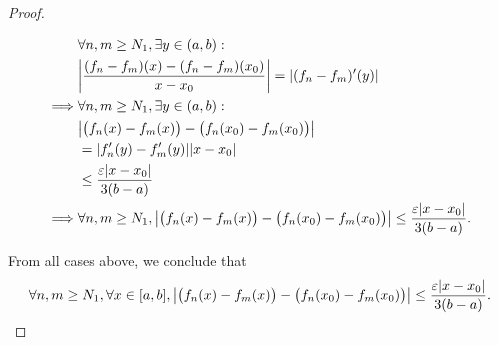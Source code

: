 \begin{proof}
\begin{itemize}
\begin{align*}
                     & \forall n, m \geq N_1, \exists y \in (a, b) :                                                                                            \\
                     & \abs{\dfrac{(f_n - f_m)(x) - (f_n - f_m)(x_0)}{x - x_0}} = \abs{(f_n - f_m)'(y)}                                                         \\
            \implies & \forall n, m \geq N_1, \exists y \in (a, b) :                                                                                            \\
                     & \abs{\big(f_n(x) - f_m(x)\big) - \big(f_n(x_0) - f_m(x_0)\big)}                                                                          \\
                     & = \abs{f_n'(y) - f_m'(y)} \abs{x - x_0}                                                                                                  \\
                     & \leq \dfrac{\varepsilon \abs{x - x_0}}{3(b - a)}                                                                                         \\
            \implies & \forall n, m \geq N_1, \abs{\big(f_n(x) - f_m(x)\big) - \big(f_n(x_0) - f_m(x_0)\big)} \leq \dfrac{\varepsilon \abs{x - x_0}}{3(b - a)}.
          \end{align*}
  \end{itemize}
  From all cases above, we conclude that
  \[
    \forall n, m \geq N_1, \forall x \in [a, b], \abs{\big(f_n(x) - f_m(x)\big) - \big(f_n(x_0) - f_m(x_0)\big)} \leq \dfrac{\varepsilon \abs{x - x_0}}{3(b - a)}.
  \]


\end{proof}
